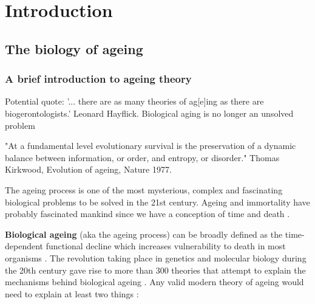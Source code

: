 
\chapter{Introduction}  \label{c:1} %

\ifpdf
    \graphicspath{{Chapter1/Figs/Raster/}{Chapter1/Figs/PDF/}{Chapter1/Figs/}}
\else
    \graphicspath{{Chapter1/Figs/Vector/}{Chapter1/Figs/}}
\fi


\section{The biology of ageing} %

\subsection{A brief introduction to ageing theory}

Potential quote: '... there are as many theories of ag[e]ing as there are biogerontologists.' Leonard Hayflick. Biological aging is no longer an unsolved problem

"At a fundamental level evolutionary survival is the preservation of a dynamic balance between information, or order, and entropy, or disorder." Thomas Kirkwood, Evolution of ageing, Nature 1977.

The ageing process is one of the most mysterious, complex and fascinating biological problems to be solved in the 21st century. Ageing and immortality have probably fascinated mankind since we have a conception of time and death \cite{Renfrew2016}. 

\bigskip

\textbf{Biological ageing} (aka the ageing process) can be broadly defined as the time-dependent functional decline which increases vulnerability to death in most organisms \cite{Lopez-Otin2013}. The revolution taking place in genetics and molecular biology during the 20th century gave rise to more than 300 theories that attempt to explain the mechanisms behind biological ageing \cite{Medvedev1990}. Any valid modern theory of ageing would need to explain at least two things \cite{Medvedev1990}:

